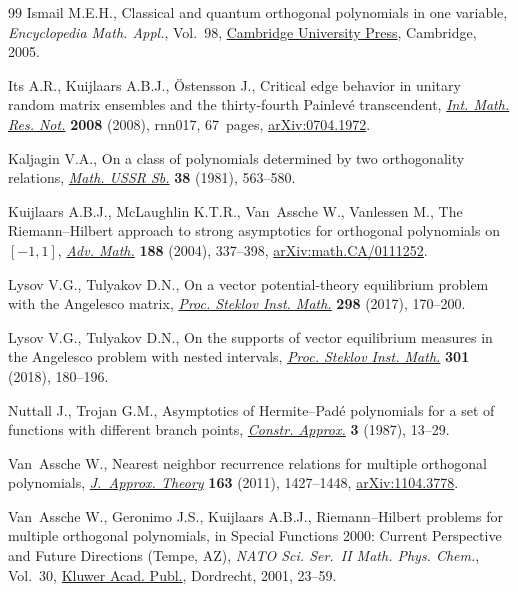 \documentclass[10pt,a4paper]{amsart}
\numberwithin{equation}{section}
\begin{document}
\begin{thebibliography}{99}
Ismail M.E.H., Classical and quantum orthogonal polynomials in one variable,
 \textit{Encyclopedia Math. Appl.}, Vol.~98,
 \href{https://doi.org/10.1017/CBO9781107325982}{Cambridge University Press},
 Cambridge, 2005.

Its A.R., Kuijlaars A.B.J., \"Ostensson J., Critical edge behavior in unitary
 random matrix ensembles and the thirty-fourth {P}ainlev\'e transcendent,
 \href{https://doi.org/10.1093/imrn/rnn017}{\textit{Int. Math. Res. Not.}}
 \textbf{2008} (2008), rnn017, 67~pages, \href{http://arxiv.org/abs/0704.1972}{arXiv:0704.1972}.

Kaljagin V.A., On a class of polynomials determined by two orthogonality
 relations,
 \href{https://doi.org/10.1070/SM1981v038n04ABEH001465}{\textit{Math. USSR
 Sb.}} \textbf{38} (1981), 563--580.

Kuijlaars A.B.J., McLaughlin K.T.R., Van~Assche W., Vanlessen M., The
 {R}iemann--{H}ilbert approach to strong asymptotics for orthogonal
 polynomials on~{$[-1,1]$},
 \href{https://doi.org/10.1016/j.aim.2003.08.015}{\textit{Adv. Math.}}
 \textbf{188} (2004), 337--398, \href{http://arxiv.org/abs/math.CA/0111252}{arXiv:math.CA/0111252}.

Lysov V.G., Tulyakov D.N., On a vector potential-theory equilibrium problem
 with the {A}ngelesco matrix,
 \href{https://doi.org/10.1134/s008154381706013x}{\textit{Proc. Steklov Inst.
 Math.}} \textbf{298} (2017), 170--200.

Lysov V.G., Tulyakov D.N., On the supports of vector equilibrium measures in
 the {A}ngelesco problem with nested intervals,
 \href{https://doi.org/10.1134/S0081543818040144}{\textit{Proc. Steklov Inst.
 Math.}} \textbf{301} (2018), 180--196.

Nuttall J., Trojan G.M., Asymptotics of {H}ermite--{P}ad\'e polynomials for a
 set of functions with different branch points,
 \href{https://doi.org/10.1007/BF01890550}{\textit{Constr. Approx.}}
 \textbf{3} (1987), 13--29.

Van~Assche W., Nearest neighbor recurrence relations for multiple orthogonal
 polynomials,
 \href{https://doi.org/10.1016/j.jat.2011.05.003}{\textit{J.~Approx. Theory}}
 \textbf{163} (2011), 1427--1448, \href{http://arxiv.org/abs/1104.3778}{arXiv:1104.3778}.

Van~Assche W., Geronimo J.S., Kuijlaars A.B.J., Riemann--{H}ilbert problems for
 multiple orthogonal polynomials, in Special {F}unctions 2000: {C}urrent
 {P}erspective and {F}uture {D}irections ({T}empe, {AZ}), \textit{NATO Sci.
 Ser.~II Math. Phys. Chem.}, Vol.~30,
 \href{https://doi.org/10.1007/978-94-010-0818-1_2}{Kluwer Acad. Publ.},
 Dordrecht, 2001, 23--59.


\end{thebibliography}
\end{document}
